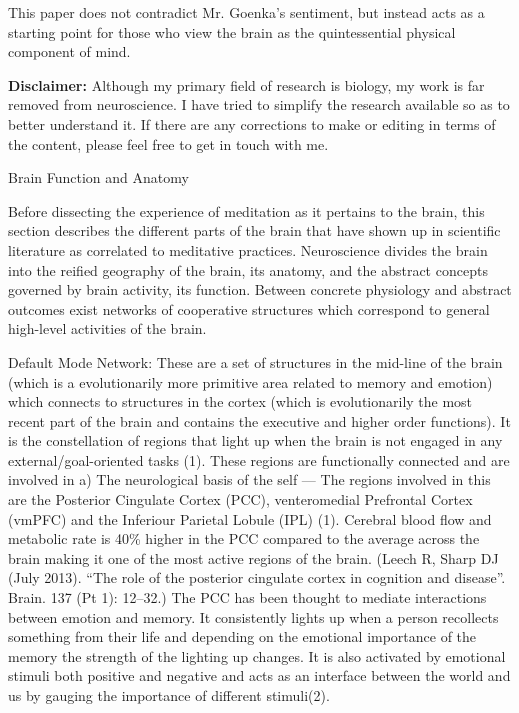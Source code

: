 \documentclass[twocolumn]{article}
\begin{document}
This paper does not contradict Mr. Goenka's sentiment, but instead acts as a starting
point for those who view the brain as the quintessential physical component of mind.

\textbf{Disclaimer:} Although my primary field of research is biology, my work is far removed
from neuroscience. I have tried to simplify the research available so as to better
understand it. If there are any corrections to make or editing in terms of the
content, please feel free to get in touch with me.

\begin{center}
  \Huge{Brain Function and Anatomy}
\end{center}

Before dissecting the experience of meditation as it pertains to the brain, this
section describes the different parts of the brain that have shown up in
scientific literature as correlated to meditative practices. Neuroscience divides the
brain into the reified geography of the brain, its anatomy, and the abstract concepts
governed by brain activity, its function. Between concrete physiology and abstract
outcomes exist networks of cooperative structures which correspond to general
high-level activities of the brain.



Default Mode Network:
These are a set of structures in the mid-line of the brain (which is a evolutionarily more primitive area related to memory and emotion) which connects to structures in the cortex (which is evolutionarily the most recent part of the brain and contains the executive and higher order functions). It is the constellation of regions that light up when the brain is not engaged in any external/goal-oriented tasks (1). These regions are functionally connected and are involved in
a) The neurological basis of the self —
The regions involved in this are the Posterior Cingulate Cortex (PCC), venteromedial Prefrontal Cortex (vmPFC) and the Inferiour Parietal Lobule (IPL) (1).
Cerebral blood flow and metabolic rate is 40\% higher in the PCC compared to the average across the brain making it one of the most active regions of the brain. (Leech R, Sharp DJ (July 2013). “The role of the posterior cingulate cortex in cognition and disease”. Brain. 137 (Pt 1): 12–32.)
The PCC has been thought to mediate interactions between emotion and memory. It consistently lights up when a person recollects something from their life and depending on the emotional importance of the memory the strength of the lighting up changes. It is also activated by emotional stimuli both positive and negative and acts as an interface between the world and us by gauging the importance of different stimuli(2).
\end{document}
